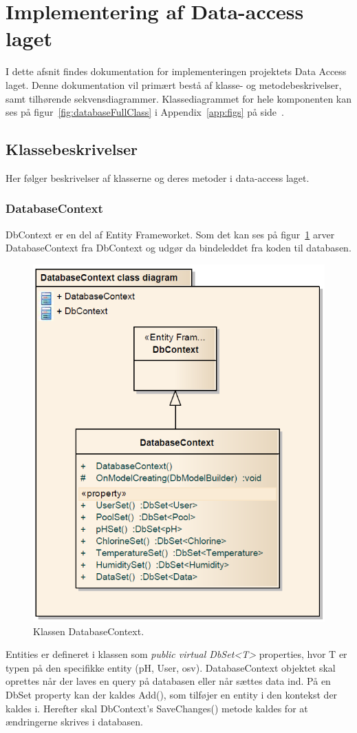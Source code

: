 \section{Implementering af Data-access laget}
I dette afsnit findes dokumentation for implementeringen projektets Data Access laget. Denne dokumentation vil primært bestå af klasse- og metodebeskrivelser, samt tilhørende sekvensdiagrammer. Klassediagrammet for hele komponenten kan ses på figur~\ref{fig:databaseFullClass} i Appendix~\ref{app:figs} på side~\pageref{fig:databaseFullClass}.

\subsection{Klassebeskrivelser}
Her følger beskrivelser af klasserne og deres metoder i data-access laget.

\subsubsection{DatabaseContext}
DbContext er en del af Entity Frameworket. Som det kan ses på figur~\ref{fig:dbContextClass} arver DatabaseContext fra DbContext \cite{microsoftdbcontext} og udgør da bindeleddet fra koden til databasen.

\begin{figure}[H]
\centering
\includegraphics[width=0.5\linewidth]{figs/implementering/dbContextClass.PNG}
\caption{Klassen DatabaseContext.}
\label{fig:dbContextClass}
\end{figure}

Entities er defineret i klassen som \textit{public virtual DbSet<T>} properties, hvor T er typen på den specifikke entity (pH, User, osv).
DatabaseContext objektet skal oprettes når der laves en query på databasen eller når sættes data ind.
På en DbSet property kan der kaldes Add(), som tilføjer en entity i den kontekst der kaldes i. Herefter skal DbContext’s SaveChanges() metode kaldes for at ændringerne skrives i databasen.

